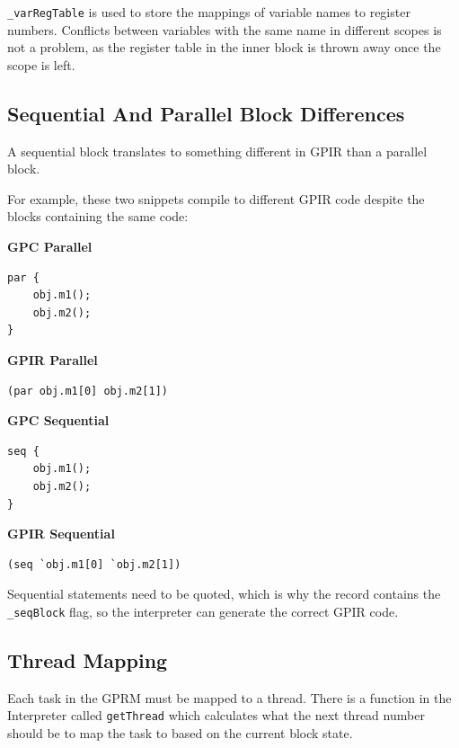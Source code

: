 \texttt{\_varRegTable} is used to store the mappings of variable names to register numbers. 
Conflicts between variables with the same name in different scopes is not a problem,
as the register table in the inner block is thrown away once the scope is left.

\subsection{Sequential And Parallel Block Differences}
A sequential block translates to something different in GPIR than a parallel block.

For example, these two snippets compile to different GPIR code despite
the blocks containing the same code:

\begin{minipage}{.48\textwidth}
\center \textbf{GPC Parallel}
\begin{lstlisting}[style=myGPC, frame=single]
par {
    obj.m1();
    obj.m2();
}
\end{lstlisting}

\center \textbf{GPIR Parallel}
\begin{lstlisting}[style=myGPIR, frame=single]
(par obj.m1[0] obj.m2[1])
\end{lstlisting}
\end{minipage}
\hfill
%
%
\begin{minipage}{.48\textwidth}
\center \textbf{GPC Sequential}
\begin{lstlisting}[style=myGPC, frame=single]
seq {
    obj.m1();
    obj.m2();
}
\end{lstlisting}

\center \textbf{GPIR Sequential}
\begin{lstlisting}[style=myGPIR, frame=single]
(seq `obj.m1[0] `obj.m2[1])
\end{lstlisting}
\end{minipage}
 
Sequential statements need to be quoted, which is why the record contains
the \texttt{\_seqBlock} flag, so the interpreter can generate the correct GPIR code.

\subsection{Thread Mapping}
Each task in the GPRM must be mapped to a thread. There is a function
in the Interpreter called \texttt{getThread} which calculates what the next thread 
number should be to map the task to based on the current block state.

